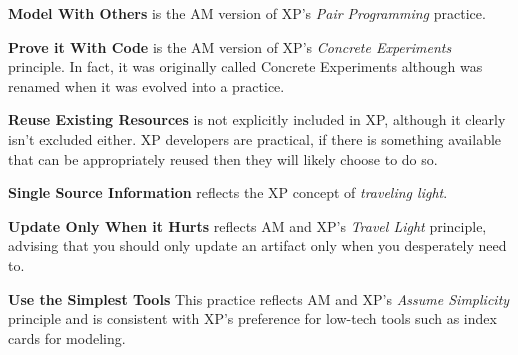 {\bf Model With Others} is the AM version of XP's \emph{Pair Programming}
practice.

{\bf Prove it With Code} is the AM version of XP's \emph{Concrete Experiments}
principle. In fact, it was originally called Concrete Experiments although was
renamed when it was evolved into a practice.

{\bf Reuse Existing Resources} is not explicitly included in XP, although it
clearly isn't excluded either. XP developers are practical, if there is
something available that can be appropriately reused then they will likely
choose to do so.

{\bf Single Source Information} reflects the XP concept of \emph{traveling
light}.

{\bf Update Only When it Hurts} reflects AM and XP's \emph{Travel Light}
principle, advising that you should only update an artifact only when you
desperately need to.

{\bf Use the Simplest Tools} This practice reflects AM and XP's \emph{Assume
Simplicity} principle and is consistent with XP's preference for low-tech tools
such as index cards for modeling.